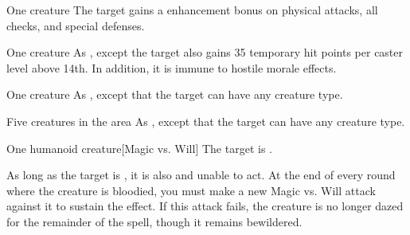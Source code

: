 \spellrng{\rngclose}
\spelldur{\durshort \dismissable}
\begin{spelltarget}{One creature}
    \spelleffect The target gains a  enhancement bonus on physical attacks, all checks, and special defenses. \spellbonusscalingdescription
\end{spelltarget}

\spellrng{\rngclose}
\spelldur{\durshort \dismissable}
\begin{spelltarget}{One creature}
    \spelleffect As , except the target also gains 35 temporary hit points  per caster level above 14th. In addition, it is immune to hostile morale effects.
\end{spelltarget}

\spellrng{\rngclose}
\begin{spelltarget}{One creature}
    \spellsuccess As , except that the target can have any creature type.
\end{spelltarget}

\begin{spelltargets}{Five creatures in the area}
    \spellsuccess As , except that the target can have any creature type.
\end{spelltargets}

\spellrng{\rngclose}
\begin{spelltarget}{One humanoid creature}[Magic vs. Will]
    \spellsuccess The target is \bewildered.

    As long as the target is \bloodied, it is also \dazed and unable to act. At the end of every round where the creature is bloodied, you must make a new Magic vs. Will attack against it to sustain the effect. If this attack fails, the creature is no longer dazed for the remainder of the spell, though it remains bewildered.
\end{spelltarget}

